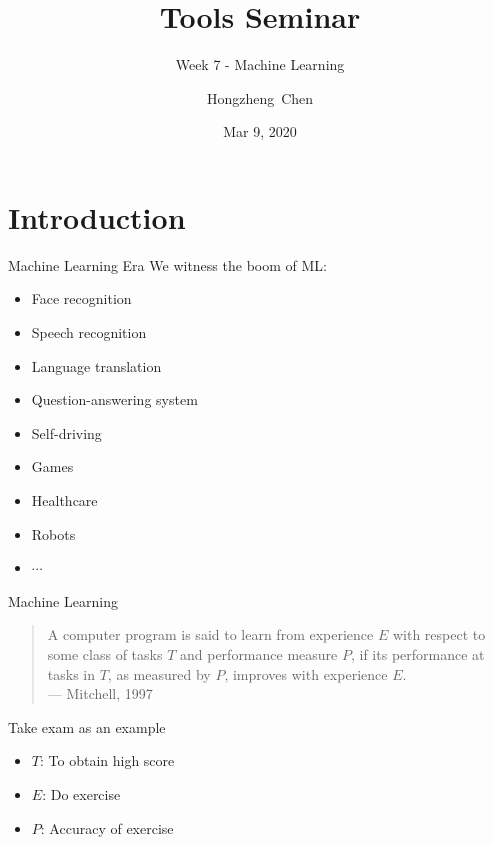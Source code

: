 \documentclass{../TexTemplate/myslide}
\title[ToolsSeminar]{Tools Seminar}
\subtitle{Week 7 - Machine Learning}
\author[chhzh123]{Hongzheng~Chen}
\date[Mar 9, 2020]{Mar 9, 2020}
\begin{document}
\begin{frame}
\titlepage
\end{frame}

\begin{frame}
\tableofcontents
\end{frame}

\section{Introduction}
\begin{frame}
\sectionpage
\end{frame}

\begin{frame}{Machine Learning Era}
We witness the boom of ML:
\begin{itemize}
	\item Face recognition
	\item Speech recognition
	\item Language translation
	\item Question-answering system
	\item Self-driving
	\item Games
	\item Healthcare
	\item Robots
	\item $\cdots$
\end{itemize}
\end{frame}

\begin{frame}{Machine Learning}
\begin{quote}
A computer program is said to learn from experience $E$ with respect to some class of tasks $T$ and performance measure $P$,
if its performance at tasks in $T$, as measured by $P$, improves with experience $E$.\\
\hfill--- Mitchell, 1997
\end{quote}
\bigskip
Take exam as an example
\begin{itemize}
	\item $T$: To obtain high score
	\item $E$: Do exercise
	\item $P$: Accuracy of exercise
\end{itemize}
\end{frame}
\end{document}
